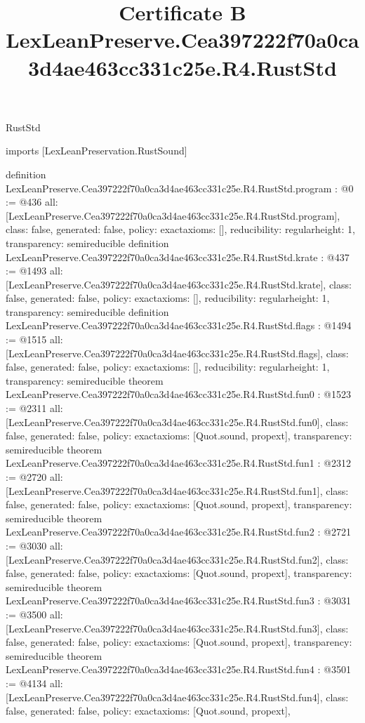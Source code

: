 \begin{lexlean}{RustStd}
\title{Certificate B LexLeanPreserve.Cea397222f70a0ca3d4ae463cc331c25e.R4.RustStd}
\begin{coremodule}
imports [LexLeanPreservation.RustSound]

definition LexLeanPreserve.Cea397222f70a0ca3d4ae463cc331c25e.R4.RustStd.program : @0 := @436 {
  all: [LexLeanPreserve.Cea397222f70a0ca3d4ae463cc331c25e.R4.RustStd.program],
  class: false,
  generated: false,
  policy: exact{axioms: []},
  reducibility: regular{height: 1},
  transparency: semireducible
}
definition LexLeanPreserve.Cea397222f70a0ca3d4ae463cc331c25e.R4.RustStd.krate : @437 := @1493 {
  all: [LexLeanPreserve.Cea397222f70a0ca3d4ae463cc331c25e.R4.RustStd.krate],
  class: false,
  generated: false,
  policy: exact{axioms: []},
  reducibility: regular{height: 1},
  transparency: semireducible
}
definition LexLeanPreserve.Cea397222f70a0ca3d4ae463cc331c25e.R4.RustStd.flags : @1494 := @1515 {
  all: [LexLeanPreserve.Cea397222f70a0ca3d4ae463cc331c25e.R4.RustStd.flags],
  class: false,
  generated: false,
  policy: exact{axioms: []},
  reducibility: regular{height: 1},
  transparency: semireducible
}
theorem LexLeanPreserve.Cea397222f70a0ca3d4ae463cc331c25e.R4.RustStd.fun0 : @1523 := @2311 {
  all: [LexLeanPreserve.Cea397222f70a0ca3d4ae463cc331c25e.R4.RustStd.fun0],
  class: false,
  generated: false,
  policy: exact{axioms: [Quot.sound, propext]},
  transparency: semireducible
}
theorem LexLeanPreserve.Cea397222f70a0ca3d4ae463cc331c25e.R4.RustStd.fun1 : @2312 := @2720 {
  all: [LexLeanPreserve.Cea397222f70a0ca3d4ae463cc331c25e.R4.RustStd.fun1],
  class: false,
  generated: false,
  policy: exact{axioms: [Quot.sound, propext]},
  transparency: semireducible
}
theorem LexLeanPreserve.Cea397222f70a0ca3d4ae463cc331c25e.R4.RustStd.fun2 : @2721 := @3030 {
  all: [LexLeanPreserve.Cea397222f70a0ca3d4ae463cc331c25e.R4.RustStd.fun2],
  class: false,
  generated: false,
  policy: exact{axioms: [Quot.sound, propext]},
  transparency: semireducible
}
theorem LexLeanPreserve.Cea397222f70a0ca3d4ae463cc331c25e.R4.RustStd.fun3 : @3031 := @3500 {
  all: [LexLeanPreserve.Cea397222f70a0ca3d4ae463cc331c25e.R4.RustStd.fun3],
  class: false,
  generated: false,
  policy: exact{axioms: [Quot.sound, propext]},
  transparency: semireducible
}
theorem LexLeanPreserve.Cea397222f70a0ca3d4ae463cc331c25e.R4.RustStd.fun4 : @3501 := @4134 {
  all: [LexLeanPreserve.Cea397222f70a0ca3d4ae463cc331c25e.R4.RustStd.fun4],
  class: false,
  generated: false,
  policy: exact{axioms: [Quot.sound, propext]},
}
\end{coremodule}
\end{lexlean}
